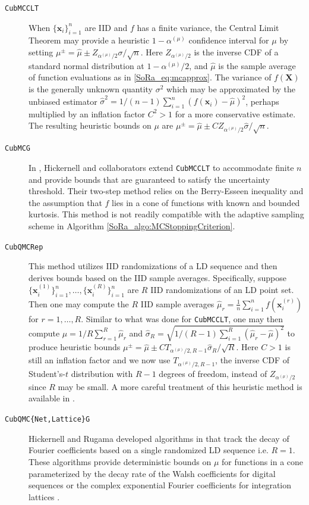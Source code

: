 \documentclass[graybox]{svmult}
\begin{document}
\begin{description}
    \item[\texttt{CubMCCLT}] When $\{\boldsymbol{x}_i\}_{i=1}^n$ are IID and $f$ has a finite variance, the Central Limit Theorem may provide a heuristic $1-\alpha^{(\mu)}$ confidence interval for $\mu$ by setting $\mu^\pm = \hat{\mu} \pm Z_{\alpha^{(\mu)}/2}\sigma/\sqrt{n}$. Here $Z_{\alpha^{(\mu)}/2}$ is the inverse CDF of a standard normal distribution at $1-\alpha^{(\mu)}/2$, and $\hat{\mu}$ is the sample average of function evaluations as in \eqref{SoRa_eq:mcapprox}. The variance of $f(\boldsymbol{X})$ is the generally unknown quantity $\sigma^2$ which may be approximated by the unbiased estimator $\hat{\sigma}^2 = 1/(n-1)\sum_{i=1}^n (f(\boldsymbol{x}_i)-\hat{\mu})^2$, perhaps multiplied by an inflation factor $C^2>1$ for a more conservative estimate. The resulting  heuristic bounds on $\mu$ are $\mu^\pm = \hat{\mu} \pm CZ_{\alpha^{(\mu)}/2} \hat{\sigma} / \sqrt{n}$.
    \item[\texttt{CubMCG}] In \cite{cubmcg}, Hickernell and collaborators extend \texttt{CubMCCLT} to accommodate  finite $n$ and provide bounds that are guaranteed to satisfy the uncertainty threshold. Their two-step method relies on the Berry-Esseen inequality and the assumption that $f$ lies in a cone of functions with known and bounded kurtosis. This method is not readily compatible with the adaptive sampling scheme in Algorithm \ref{SoRa_algo:MCStoppingCriterion}.
    \item[\texttt{CubQMCRep}] This method utilizes IID randomizations of a LD sequence and then derives bounds based on the IID sample averages. Specifically, suppose $\{\boldsymbol{x}_i^{(1)}\}_{i=1}^n,\dots,\{\boldsymbol{x}_i^{(R)}\}_{i=1}^n$ are $R$ IID randomizations of an LD point set. Then one may compute the $R$ IID sample averages $\hat{\mu}_r = \frac{1}{n} \sum_{i=1}^n f(\boldsymbol{x}_i^{(r)})$ for $r = 1,\dots,R$. Similar to what was done for \texttt{CubMCCLT}, one may then compute $\hat{\mu} = 1/R \sum_{r=1}^R \hat{\mu}_r$ and $\hat{\sigma}_R = \sqrt{1/(R-1)\sum_{i=1}^R(\hat{\mu}_r - \hat{\mu})^2}$ to produce heuristic bounds $\mu^\pm = \hat{\mu} \pm C T_{\alpha^{(\mu)}/2,R-1} \hat{\sigma}_R / \sqrt{R}$. Here $C>1$ is still an inflation factor and we now use $T_{\alpha^{(\mu)}/2,R-1}$, the inverse CDF of Student's-$t$ distribution with $R-1$ degrees of freedom, instead of $Z_{\alpha^{(\mu)}/2}$ since $R$ may be small.
    A more careful treatment of this heuristic method is available in \cite[Chapter 17]{mcbook}. 
    \item[\texttt{CubQMC\{Net,Lattice\}G}] Hickernell and Rugama developed algorithms in \cite{adaptive_qmc} that track the decay of Fourier coefficients based on a single randomized LD sequence i.e. $R=1$. These algorithms provide deterministic bounds on $\mu$ for functions in a cone parameterized by the decay rate of the Walsh coefficients for digital sequences \cite{cubqmcsobol} or the complex exponential Fourier coefficients for integration lattices \cite{cubqmclattice}. 

\end{description}
\end{document}
